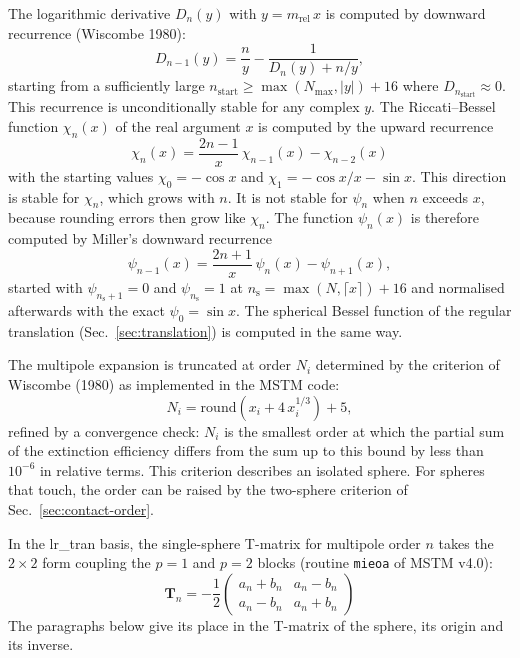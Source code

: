 \documentclass[11pt,a4paper]{article}
\begin{document}
The logarithmic derivative $D_n(y)$ with $y = m_\mathrm{rel}\,x$ is computed by downward recurrence (Wiscombe 1980):
\begin{equation}
  D_{n-1}(y) = \frac{n}{y} - \frac{1}{D_n(y) + n/y},
  \label{eq:dn-recurrence}
\end{equation}
starting from a sufficiently large $n_\mathrm{start} \geq \max(N_\mathrm{max}, |y|) + 16$ where $D_{n_\mathrm{start}} \approx 0$.
This recurrence is unconditionally stable for any complex $y$.
The Riccati--Bessel function $\chi_n(x)$ of the real argument $x$ is computed by the upward recurrence
\begin{equation}
  \chi_n(x) = \frac{2n - 1}{x}\,\chi_{n-1}(x) - \chi_{n-2}(x)
  \label{eq:bessel-recurrence}
\end{equation}
with the starting values $\chi_0 = -\cos x$ and $\chi_1 = -\cos x / x - \sin x$.
This direction is stable for $\chi_n$, which grows with $n$.
It is not stable for $\psi_n$ when $n$ exceeds $x$, because rounding errors then grow like $\chi_n$.
The function $\psi_n(x)$ is therefore computed by Miller's downward recurrence
\begin{equation}
  \psi_{n-1}(x) = \frac{2n + 1}{x}\,\psi_n(x) - \psi_{n+1}(x),
  \label{eq:miller-recurrence}
\end{equation}
started with $\psi_{n_\mathrm{s}+1} = 0$ and $\psi_{n_\mathrm{s}} = 1$ at $n_\mathrm{s} = \max(N, \lceil x \rceil) + 16$ and normalised afterwards with the exact $\psi_0 = \sin x$.
The spherical Bessel function of the regular translation (Sec.~\ref{sec:translation}) is computed in the same way.

The multipole expansion is truncated at order $N_i$ determined by the criterion of Wiscombe (1980) as implemented in the MSTM code:
\begin{equation}
  N_i = \mathrm{round}\!\left(x_i + 4\,x_i^{1/3}\right) + 5,
  \label{eq:nstop}
\end{equation}
refined by a convergence check: $N_i$ is the smallest order at which the partial sum of the extinction efficiency differs from the sum up to this bound by less than $10^{-6}$ in relative terms.
This criterion describes an isolated sphere.
For spheres that touch, the order can be raised by the two-sphere criterion of Sec.~\ref{sec:contact-order}.

In the lr\_tran basis, the single-sphere T-matrix for multipole order $n$ takes the $2 \times 2$ form coupling the $p = 1$ and $p = 2$ blocks (routine \texttt{mieoa} of MSTM v4.0):
\begin{equation}
  \mathbf{T}_n = -\frac{1}{2}
  \begin{pmatrix} a_n + b_n & a_n - b_n \\ a_n - b_n & a_n + b_n \end{pmatrix}
  \label{eq:tmatrix-lr}
\end{equation}
The paragraphs below give its place in the T-matrix of the sphere, its origin and its inverse.
\end{document}
